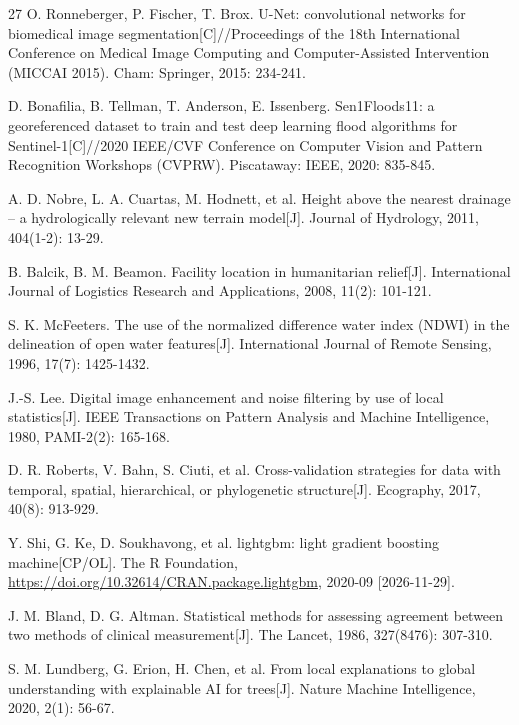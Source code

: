 \begin{thebibliography}{27}
O. Ronneberger, P. Fischer, T. Brox. U-Net: convolutional networks for biomedical image segmentation[C]//Proceedings of the 18th International Conference on Medical Image Computing and Computer-Assisted Intervention (MICCAI 2015). Cham: Springer, 2015: 234-241.

D. Bonafilia, B. Tellman, T. Anderson, E. Issenberg. Sen1Floods11: a georeferenced dataset to train and test deep learning flood algorithms for Sentinel-1[C]//2020 IEEE/CVF Conference on Computer Vision and Pattern Recognition Workshops (CVPRW). Piscataway: IEEE, 2020: 835-845.

A. D. Nobre, L. A. Cuartas, M. Hodnett, et al. Height above the nearest drainage -- a hydrologically relevant new terrain model[J]. Journal of Hydrology, 2011, 404(1-2): 13-29.

B. Balcik, B. M. Beamon. Facility location in humanitarian relief[J]. International Journal of Logistics Research and Applications, 2008, 11(2): 101-121.

S. K. McFeeters. The use of the normalized difference water index (NDWI) in the delineation of open water features[J]. International Journal of Remote Sensing, 1996, 17(7): 1425-1432.

J.-S. Lee. Digital image enhancement and noise filtering by use of local statistics[J]. IEEE Transactions on Pattern Analysis and Machine Intelligence, 1980, PAMI-2(2): 165-168.

D. R. Roberts, V. Bahn, S. Ciuti, et al. Cross-validation strategies for data with temporal, spatial, hierarchical, or phylogenetic structure[J]. Ecography, 2017, 40(8): 913-929.

Y. Shi, G. Ke, D. Soukhavong, et al. lightgbm: light gradient boosting machine[CP/OL]. The R Foundation, \url{https://doi.org/10.32614/CRAN.package.lightgbm}, \mbox{2020-09} \mbox{[2026-11-29]}.

J. M. Bland, D. G. Altman. Statistical methods for assessing agreement between two methods of clinical measurement[J]. The Lancet, 1986, 327(8476): 307-310.

S. M. Lundberg, G. Erion, H. Chen, et al. From local explanations to global understanding with explainable AI for trees[J]. Nature Machine Intelligence, 2020, 2(1): 56-67.


\end{thebibliography}

